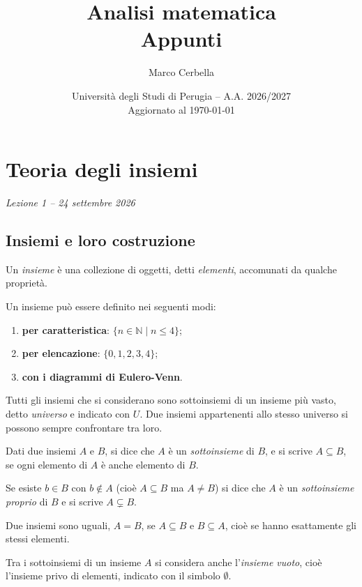 \documentclass[11pt,a4paper]{article}
\title{Analisi matematica\\[0.4em]\large Appunti}
\author{Marco Cerbella}
\date{Università degli Studi di Perugia -- A.A. 2026/2027\\ Aggiornato al \today}
\begin{document}
\maketitle
\setcounter{tocdepth}{1}
\tableofcontents
\clearpage

\section[Teoria degli insiemi (Lezione 1 -- 24 settembre 2026)]{Teoria degli insiemi}
\noindent\emph{Lezione 1 -- 24 settembre 2026}
\subsection{Insiemi e loro costruzione}

\begin{definizione}
Un \emph{insieme} è una collezione di oggetti, detti \emph{elementi},
accomunati da qualche proprietà.
\end{definizione}

Un insieme può essere definito nei seguenti modi:
\begin{enumerate}
    \item \textbf{per caratteristica}: $\{n \in \mathbb{N} \mid n \leq 4\}$;
    \item \textbf{per elencazione}: $\{0, 1, 2, 3, 4\}$;
    \item \textbf{con i diagrammi di Eulero-Venn}.
\end{enumerate}

Tutti gli insiemi che si considerano sono sottoinsiemi di un insieme più
vasto, detto \emph{universo} e indicato con $U$. Due insiemi appartenenti
allo stesso universo si possono sempre confrontare tra loro.

\begin{definizione}
Dati due insiemi $A$ e $B$, si dice che $A$ è un \emph{sottoinsieme} di $B$,
e si scrive $A \subseteq B$, se ogni elemento di $A$ è anche elemento di $B$.
\end{definizione}

Se esiste $b \in B$ con $b \notin A$ (cioè $A \subseteq B$ ma $A \neq B$) si dice che $A$ è un \emph{sottoinsieme proprio} di $B$ e si scrive $A \subsetneq B$.

Due insiemi sono uguali, $A = B$, se $A \subseteq B$ e $B \subseteq A$,
cioè se hanno esattamente gli stessi elementi.

Tra i sottoinsiemi di un insieme $A$ si considera anche l'\emph{insieme vuoto},
cioè l'insieme privo di elementi, indicato con il simbolo $\emptyset$.
\end{document}
